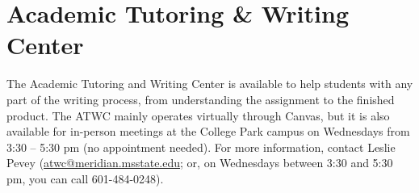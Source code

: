 \section{Academic Tutoring \& Writing Center}

The Academic Tutoring and Writing Center is available to help students with any part of the writing process, from understanding the assignment to the finished product. The ATWC mainly operates virtually through Canvas, but it is also available for in-person meetings at the College Park campus on Wednesdays from 3:30 – 5:30 pm (no appointment needed). For more information, contact Leslie Pevey (\url{atwc@meridian.msstate.edu}; or, on Wednesdays between 3:30 and 5:30 pm, you can call 601-484-0248).
